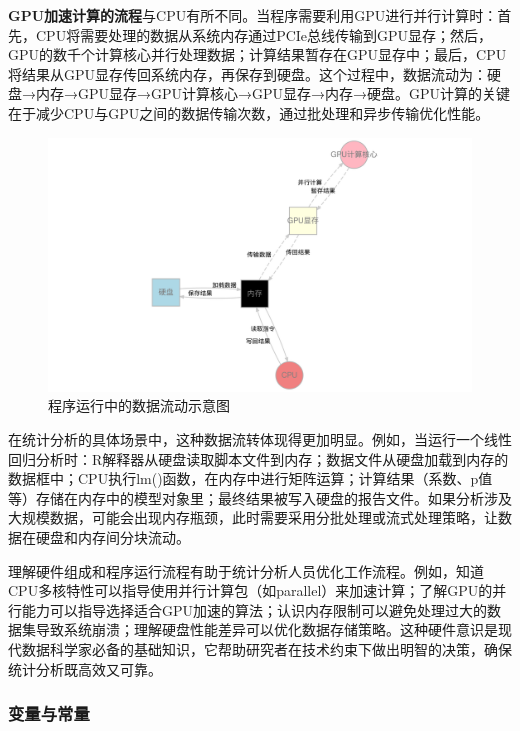 \documentclass[
  twoside]{book}
\begin{document}
\textbf{GPU加速计算的流程}与CPU有所不同。当程序需要利用GPU进行并行计算时：首先，CPU将需要处理的数据从系统内存通过PCIe总线传输到GPU显存；然后，GPU的数千个计算核心并行处理数据；计算结果暂存在GPU显存中；最后，CPU将结果从GPU显存传回系统内存，再保存到硬盘。这个过程中，数据流动为：硬盘→内存→GPU显存→GPU计算核心→GPU显存→内存→硬盘。GPU计算的关键在于减少CPU与GPU之间的数据传输次数，通过批处理和异步传输优化性能。

\begin{figure}
\centering
\includegraphics{imgs/hardware_flow.png}
\caption{\label{fig:hardware-flow}程序运行中的数据流动示意图}
\end{figure}

在统计分析的具体场景中，这种数据流转体现得更加明显。例如，当运行一个线性回归分析时：R解释器从硬盘读取脚本文件到内存；数据文件从硬盘加载到内存的数据框中；CPU执行lm()函数，在内存中进行矩阵运算；计算结果（系数、p值等）存储在内存中的模型对象里；最终结果被写入硬盘的报告文件。如果分析涉及大规模数据，可能会出现内存瓶颈，此时需要采用分批处理或流式处理策略，让数据在硬盘和内存间分块流动。

理解硬件组成和程序运行流程有助于统计分析人员优化工作流程。例如，知道CPU多核特性可以指导使用并行计算包（如parallel）来加速计算；了解GPU的并行能力可以指导选择适合GPU加速的算法；认识内存限制可以避免处理过大的数据集导致系统崩溃；理解硬盘性能差异可以优化数据存储策略。这种硬件意识是现代数据科学家必备的基础知识，它帮助研究者在技术约束下做出明智的决策，确保统计分析既高效又可靠。

\hypertarget{ux53d8ux91cfux4e0eux5e38ux91cf}{%
\subsubsection{变量与常量}\label{ux53d8ux91cfux4e0eux5e38ux91cf}}
\end{document}
